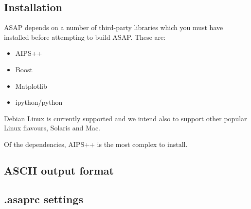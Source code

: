 \documentclass[11pt]{article}
\begin{document}
\subsection{Installation}

ASAP depends on a number of third-party libraries which you must
have installed before attempting to build ASAP. These are:

\begin{itemize}
\item AIPS++
\item Boost
\item Matplotlib
\item ipython/python
\end{itemize}

Debian Linux is currently supported and we intend also
to support other popular Linux flavours, Solaris and Mac.

Of the dependencies, AIPS++ is the most complex to install.

\subsection{ASCII output format}

\subsection{.asaprc settings}
\end{document}
